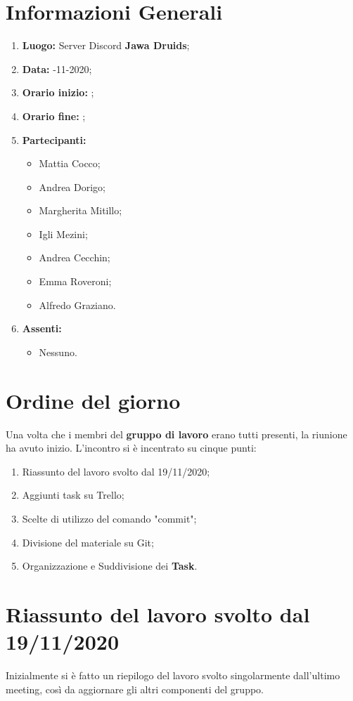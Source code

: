 \newpage
	\section{Informazioni Generali}
	\begin{enumerate}
		\item \textbf{Luogo:} \normalfont Server Discord \textbf{Jawa Druids};
		\item \textbf{Data:} -11-2020;
		\item \textbf{Orario inizio:} ;
		\item \textbf{Orario fine:} ;
		\item \textbf{Partecipanti:}
		\begin{itemize}
			\item Mattia Cocco;
			\item Andrea Dorigo;
			\item Margherita Mitillo;
			\item Igli Mezini;
			\item Andrea Cecchin;
			\item Emma Roveroni;
			\item Alfredo Graziano.
		\end{itemize}
		\item \textbf{Assenti:}
		\begin{itemize}
			\item Nessuno.
		\end{itemize}
	\end{enumerate}
	\section{Ordine del giorno}	
	Una volta che i membri del \textbf{gruppo di lavoro} erano tutti presenti, la riunione ha avuto inizio.
	L'incontro si è incentrato su cinque punti:
	\begin{enumerate}
		\item Riassunto del lavoro svolto dal 19/11/2020;
		\item Aggiunti task su Trello;
		\item Scelte di utilizzo del comando "commit";
		\item Divisione del materiale su Git;
		\item Organizzazione e Suddivisione dei \textbf{Task}.
	\end{enumerate}
	
	\section{Riassunto del lavoro svolto dal 19/11/2020}
	Inizialmente si è fatto un riepilogo del lavoro svolto singolarmente dall'ultimo meeting, così da aggiornare gli altri componenti del gruppo.
	
